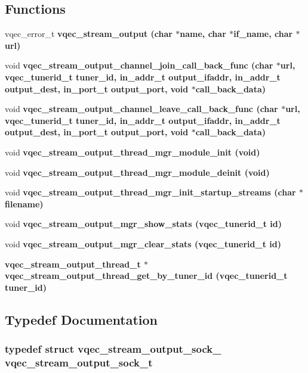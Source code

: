 \subsection*{Functions}
\begin{CompactItemize}
\item 
vqec\_\-error\_\-t \bf{vqec\_\-stream\_\-output} (char $\ast$name, char $\ast$if\_\-name, char $\ast$url)
\item 
void \bf{vqec\_\-stream\_\-output\_\-channel\_\-join\_\-call\_\-back\_\-func} (char $\ast$url, vqec\_\-tunerid\_\-t tuner\_\-id, in\_\-addr\_\-t output\_\-ifaddr, in\_\-addr\_\-t output\_\-dest, in\_\-port\_\-t output\_\-port, void $\ast$call\_\-back\_\-data)
\item 
void \bf{vqec\_\-stream\_\-output\_\-channel\_\-leave\_\-call\_\-back\_\-func} (char $\ast$url, vqec\_\-tunerid\_\-t tuner\_\-id, in\_\-addr\_\-t output\_\-ifaddr, in\_\-addr\_\-t output\_\-dest, in\_\-port\_\-t output\_\-port, void $\ast$call\_\-back\_\-data)
\item 
void \bf{vqec\_\-stream\_\-output\_\-thread\_\-mgr\_\-module\_\-init} (void)
\item 
void \bf{vqec\_\-stream\_\-output\_\-thread\_\-mgr\_\-module\_\-deinit} (void)
\item 
void \bf{vqec\_\-stream\_\-output\_\-thread\_\-mgr\_\-init\_\-startup\_\-streams} (char $\ast$\bf{filename})
\item 
void \bf{vqec\_\-stream\_\-output\_\-mgr\_\-show\_\-stats} (vqec\_\-tunerid\_\-t id)
\item 
void \bf{vqec\_\-stream\_\-output\_\-mgr\_\-clear\_\-stats} (vqec\_\-tunerid\_\-t id)
\item 
\bf{vqec\_\-stream\_\-output\_\-thread\_\-t} $\ast$ \bf{vqec\_\-stream\_\-output\_\-thread\_\-get\_\-by\_\-tuner\_\-id} (vqec\_\-tunerid\_\-t tuner\_\-id)
\end{CompactItemize}


\subsection{Typedef Documentation}
\subsubsection{\setlength{\rightskip}{0pt plus 5cm}typedef struct \bf{vqec\_\-stream\_\-output\_\-sock\_\-}  \bf{vqec\_\-stream\_\-output\_\-sock\_\-t}}\label{vqec__stream__output__thread__mgr_8h_b5b6a6782bdacc1b972b16fc5623e2be}


